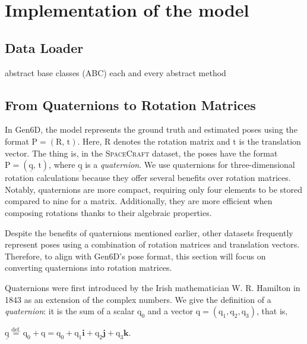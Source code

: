 
\chapter{Implementation of the model}\label{chapter:implementation_of_the_model}

\section{Data Loader}
abstract base classes (ABC)
each and every abstract method

\section{From Quaternions to Rotation Matrices}
\pagestyle{fancy}
\fancyhf{}
\renewcommand{\footrulewidth}{0.4pt} %
\fancyfoot[C]{\small\thepage} %

In Gen6D, the model represents the ground truth and estimated poses using the format ${\bm{\mathrm{P}}}=(\bm{\mathrm{R}},\,\bm{\mathrm{t}})$. Here, $\bm{\mathrm{R}}$ denotes the rotation matrix and $\bm{\mathrm{t}}$ is the translation vector.
The thing is, in the \textsc{SpaceCraft} dataset, the poses have the format ${\bm{\mathrm{P}}}=(\underline{\bm{\mathrm{q}}},\,\bm{\mathrm{t}})$, where $\underline{\bm{\mathrm{q}}}$ is a \textit{quaternion}. We use quaternions for three-dimensional rotation calculations because they offer several benefits over rotation matrices. Notably, quaternions are more compact, requiring only four elements to be stored compared to nine for a matrix. Additionally, they are more efficient when composing rotations thanks to their algebraic properties.

Despite the benefits of quaternions mentioned earlier, other datasets frequently represent poses using a combination of rotation matrices and translation vectors. Therefore, to align with Gen6D's pose format, this section will focus on converting quaternions into rotation matrices.

\bigbreak 

Quaternions were first introduced by the Irish mathematician W. R. Hamilton in 1843 as an extension of the complex numbers. We give the definition of a \textit{quaternion}: it is the sum of a scalar $\mathrm{q}_0$ and a vector $\bm{\mathrm{q}}=(\mathrm{q}_1, \mathrm{q}_2, \mathrm{q}_3)$, that is,
\begin{center}
	$\underline{\bm{\mathrm{q}}} \stackrel{\text{def.}}{=} \mathrm{q}_0 + \bm{\mathrm{q}} = \mathrm{q}_0 + \mathrm{q}_1\bm{i} + \mathrm{q}_2\bm{j} + \mathrm{q}_3\bm{k}$.
\end{center}


